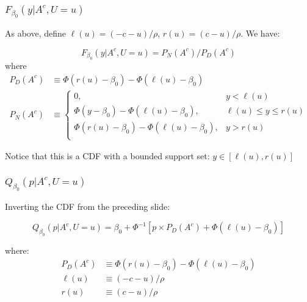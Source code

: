 \begin{frame}
  \frametitle{$F_{\beta_0}(y|A^c,U=u)$}

  \footnotesize
    As above, define $\ell(u) = (-c -u)/\rho$, $r(u) = (c - u)/\rho$. We have:

    \[F_{\beta_0}(y|A^c,U=u) = P_N(A^c) / P_D(A^c) \]
where
\begin{align*}
  P_D(A^c) &\equiv \Phi\left(r(u) - \beta_0 \right) - \Phi\left( \ell(u) - \beta_0\right) \\
 P_N(A^c) &\equiv 
  \left\{
 \begin{array}{rr}
   0 ,& y < \ell(u)\\
   \Phi(y - \beta_0) - \Phi\left( \ell(u) - \beta_0 \right) ,& \ell(u) \leq y \leq r(u)\\
   \Phi\left(r(u) - \beta_0 \right) - \Phi\left( \ell(u) - \beta_0\right) 
 ,& y > r(u) \\
 \end{array}
 \right.
\end{align*}

\vspace{1em}
\alert{Notice that this is a CDF with a bounded support set: $y\in \left[ \ell(u), r(u) \right]$}
\end{frame}
\begin{frame}
  \frametitle{$Q_{\beta_0}(p|A^c,U=u)$}

  \footnotesize
Inverting the CDF from the preceding slide:

\begin{equation*}
  Q_{\beta_0}(p|A^c,U=u) = \beta_0 + \Phi^{-1}\left[ p\times P_D(A^c) + \Phi\left( \ell(u) - \beta_0 \right) \right]
\end{equation*}

where:
\begin{align*}
  P_D(A^c) &\equiv \Phi\left(r(u) - \beta_0 \right) - \Phi\left( \ell(u) - \beta_0\right) \\
  \ell(u) &\equiv (-c - u)/\rho\\
  r(u) &\equiv (c - u)/\rho
\end{align*}
\end{frame}
